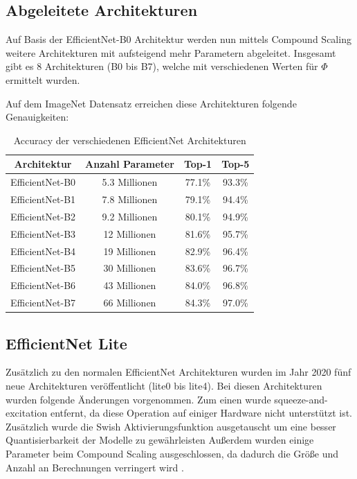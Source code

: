 \documentclass[conference]{IEEEtran}
\begin{document}
\subsection{Abgeleitete Architekturen}
Auf Basis der EfficientNet-B0 Architektur werden nun mittels Compound Scaling weitere Architekturen mit aufsteigend mehr Parametern abgeleitet. Insgesamt gibt es 8 Architekturen (B0 bis B7), welche mit verschiedenen Werten für $\Phi$ ermittelt wurden.

Auf dem ImageNet Datensatz \cite{b3} erreichen diese Architekturen folgende Genauigkeiten:

\begin{table}[htbp]
\caption{Accuracy der verschiedenen EfficientNet Architekturen \cite{b7}}
\begin{center}
\begin{tabular}{|c|c|c|c|}
\hline
Architektur     & Anzahl Parameter & Top-1  & Top-5  \\
\hline
EfficientNet-B0 & 5.3 Millionen    & 77.1\% & 93.3\% \\
EfficientNet-B1 & 7.8 Millionen    & 79.1\% & 94.4\% \\
EfficientNet-B2 & 9.2 Millionen    & 80.1\% & 94.9\% \\
EfficientNet-B3 & 12 Millionen     & 81.6\% & 95.7\% \\
EfficientNet-B4 & 19 Millionen     & 82.9\% & 96.4\% \\
EfficientNet-B5 & 30 Millionen     & 83.6\% & 96.7\% \\
EfficientNet-B6 & 43 Millionen     & 84.0\% & 96.8\% \\
EfficientNet-B7 & 66 Millionen     & 84.3\% & 97.0\% \\
\hline
\end{tabular}
\end{center}
\end{table}

\subsection{EfficientNet Lite}
Zusätzlich zu den normalen EfficientNet Architekturen wurden im Jahr 2020 fünf neue Architekturen veröffentlicht (lite0 bis lite4).
Bei diesen Architekturen wurden folgende Änderungen vorgenommen. Zum einen wurde squeeze-and-excitation entfernt, da diese Operation auf einiger Hardware nicht unterstützt ist. Zusätzlich wurde die Swish Aktivierungsfunktion ausgetauscht um eine besser Quantisierbarkeit der Modelle zu gewährleisten
Außerdem wurden einige Parameter beim Compound Scaling ausgeschlossen, da dadurch die Größe und Anzahl an Berechnungen verringert wird \cite{b8}.
\end{document}
